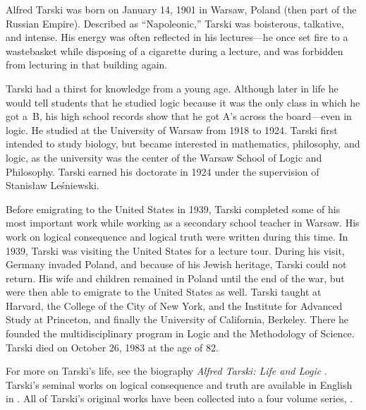 \documentclass[../../../include/open-logic-section]{subfiles}
\begin{document}



Alfred Tarski was born on January 14, 1901 in Warsaw, Poland (then
part of the Russian Empire). Described as ``Napoleonic,'' Tarski was
boisterous, talkative, and intense.  His energy was often reflected in
his lectures---he once set fire to a wastebasket while disposing of a
cigarette during a lecture, and was forbidden from lecturing in that
building again.

Tarski had a thirst for knowledge from a young age. Although later in
life he would tell students that he studied logic because it was the
only class in which he got a~B, his high school records show that he
got A's across the board---even in logic. He studied at the University
of Warsaw from 1918 to 1924. Tarski first intended to study
biology, but became interested in mathematics, philosophy, and logic,
as the university was the center of the Warsaw School of Logic and
Philosophy. Tarski earned his doctorate in 1924 under the supervision of
Stanis\l{}aw Le\'{s}niewski.

Before emigrating to the United States in 1939, Tarski completed some
of his most important work while working as a secondary school teacher
in Warsaw. His work on logical consequence and logical truth were
written during this time. In 1939, Tarski was visiting the United
States for a lecture tour. During his visit, Germany invaded Poland,
and because of his Jewish heritage, Tarski could not return.  His wife
and children remained in Poland until the end of the war, but were
then able to emigrate to the United States as well.  Tarski taught at
Harvard, the College of the City of New York, and the Institute for
Advanced Study at Princeton, and finally the University of California,
Berkeley. There he founded the multidisciplinary program in Logic and
the Methodology of Science.  Tarski died on October 26, 1983 at the
age of 82.

\begin{reading} 
For more on Tarski's life, see the biography \emph{Alfred Tarski: Life
  and Logic} \citep{Feferman2004}. Tarski's seminal works on logical
consequence and truth are available in English in \citep{Tarski1983}.
All of Tarski's original works have been collected into a four volume
series, \citep{Tarski1981}.
\end{reading}
\end{document}
